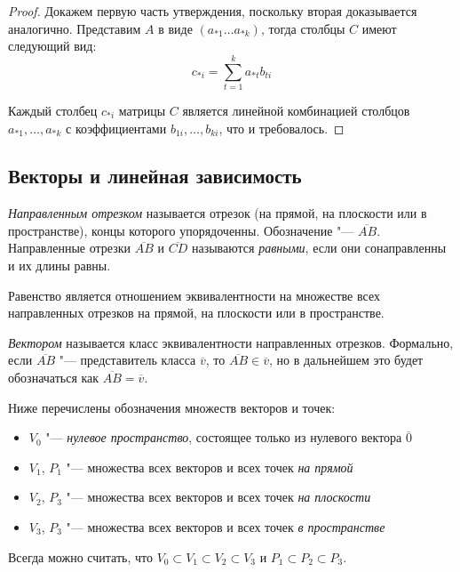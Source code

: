 \begin{proof}
	Докажем первую часть утверждения, поскольку вторая доказывается аналогично. Представим $A$ в виде $(a_{*1} \dots a_{*k})$, тогда столбцы $C$ имеют следующий вид:
	\[c_{*i} = \sum_{t = 1}^{k}a_{*t}b_{ti}\]
	
	Каждый столбец $c_{*i}$ матрицы $C$ является линейной комбинацией столбцов $a_{*1}, \dots, a_{*k}$ с коэффициентами $b_{1i}, \dots, b_{ki}$, что и требовалось.
\end{proof}

\subsection{Векторы и линейная зависимость}

\begin{definition}
	\textit{Направленным отрезком} называется отрезок (на прямой, на плоскости или в пространстве), концы которого упорядоченны. Обозначение "--- $\overline{AB}$. Направленные отрезки $\overline{AB}$ и $\overline{CD}$ называются \textit{равными}, если они сонаправленны и их длины равны.
\end{definition}

\begin{note}
	Равенство является отношением эквивалентности на множестве всех направленных отрезков на прямой, на плоскости или в пространстве.
\end{note}

\begin{definition}
	\textit{Вектором} называется класс эквивалентности направленных отрезков. Формально, если $\overline{AB}$ "--- представитель класса $\overline{v}$, то $\overline{AB} \in \overline{v}$, но в дальнейшем это будет обозначаться как $\overline{AB} = \overline{v}$.
\end{definition}

\begin{definition}
	Ниже перечислены обозначения множеств векторов и точек:
	\begin{itemize}
		\item $V_0$ "--- \textit{нулевое пространство}, состоящее только из нулевого вектора $\overline 0$
		\item $V_1$, $P_1$ "--- множества всех векторов и всех точек \textit{на прямой}
		\item $V_2$, $P_3$ "--- множества всех векторов и всех точек \textit{на плоскости}
		\item $V_3$, $P_3$ "--- множества всех векторов и всех точек \textit{в пространстве}
	\end{itemize}
	
	Всегда можно считать, что $V_0 \subset V_1 \subset V_2 \subset V_3$ и $P_1 \subset P_2 \subset P_3$.
\end{definition}

